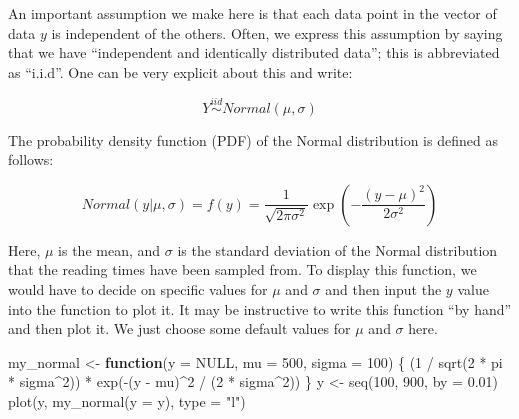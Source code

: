 \documentclass[
  12pt,
]{krantz}
\newenvironment{Shaded}{\begin{snugshade}}{\end{snugshade}}
\newcommand{\AttributeTok}[1]{\textcolor[rgb]{0.77,0.63,0.00}{#1}}
\newcommand{\ConstantTok}[1]{\textcolor[rgb]{0.00,0.00,0.00}{#1}}
\newcommand{\ControlFlowTok}[1]{\textcolor[rgb]{0.13,0.29,0.53}{\textbf{#1}}}
\newcommand{\DecValTok}[1]{\textcolor[rgb]{0.00,0.00,0.81}{#1}}
\newcommand{\FloatTok}[1]{\textcolor[rgb]{0.00,0.00,0.81}{#1}}
\newcommand{\FunctionTok}[1]{\textcolor[rgb]{0.00,0.00,0.00}{#1}}
\newcommand{\NormalTok}[1]{#1}
\newcommand{\OtherTok}[1]{\textcolor[rgb]{0.56,0.35,0.01}{#1}}
\newcommand{\SpecialCharTok}[1]{\textcolor[rgb]{0.00,0.00,0.00}{#1}}
\newcommand{\StringTok}[1]{\textcolor[rgb]{0.31,0.60,0.02}{#1}}
\theoremstyle{definition}
\theoremstyle{definition}
\theoremstyle{definition}
\theoremstyle{definition}
\theoremstyle{remark}
\begin{document}
An important assumption we make here is that each data point in the vector of data \(y\) is independent of the others. Often, we express this assumption by saying that we have ``independent and identically distributed data''; this is abbreviated as ``i.i.d''. One can be very explicit about this and write:

\begin{equation}
Y \stackrel{iid}{\sim}  Normal(\mu,\sigma)
\end{equation}

The probability density function (PDF) of the Normal distribution is defined as follows:

\begin{equation}
Normal(y|\mu,\sigma)=f(y)= \frac{1}{\sqrt{2\pi \sigma^2}} \exp \left(-\frac{(y-\mu)^2}{2\sigma^2} \right)
\end{equation}

Here, \(\mu\) is the mean, and \(\sigma\) is the standard deviation of the Normal distribution that the reading times have been sampled from. To display this function, we would have to decide on specific values for \(\mu\) and \(\sigma\) and then input the \(y\) value into the function to plot it. It may be instructive to write this function ``by hand'' and then plot it. We just choose some default values for \(\mu\) and \(\sigma\) here.

\begin{Shaded}
\begin{Highlighting}[]
\NormalTok{my\_normal }\OtherTok{\textless{}{-}} \ControlFlowTok{function}\NormalTok{(}\AttributeTok{y =} \ConstantTok{NULL}\NormalTok{, }\AttributeTok{mu =} \DecValTok{500}\NormalTok{, }\AttributeTok{sigma =} \DecValTok{100}\NormalTok{) \{}
\NormalTok{  (}\DecValTok{1} \SpecialCharTok{/} \FunctionTok{sqrt}\NormalTok{(}\DecValTok{2} \SpecialCharTok{*}\NormalTok{ pi }\SpecialCharTok{*}\NormalTok{ sigma}\SpecialCharTok{\^{}}\DecValTok{2}\NormalTok{)) }\SpecialCharTok{*} \FunctionTok{exp}\NormalTok{(}\SpecialCharTok{{-}}\NormalTok{(y }\SpecialCharTok{{-}}\NormalTok{ mu)}\SpecialCharTok{\^{}}\DecValTok{2} \SpecialCharTok{/}\NormalTok{ (}\DecValTok{2} \SpecialCharTok{*}\NormalTok{ sigma}\SpecialCharTok{\^{}}\DecValTok{2}\NormalTok{))}
\NormalTok{\}}
\NormalTok{y }\OtherTok{\textless{}{-}} \FunctionTok{seq}\NormalTok{(}\DecValTok{100}\NormalTok{, }\DecValTok{900}\NormalTok{, }\AttributeTok{by =} \FloatTok{0.01}\NormalTok{)}
\FunctionTok{plot}\NormalTok{(y, }\FunctionTok{my\_normal}\NormalTok{(}\AttributeTok{y =}\NormalTok{ y), }\AttributeTok{type =} \StringTok{"l"}\NormalTok{)}
\end{Highlighting}
\end{Shaded}
\end{document}
